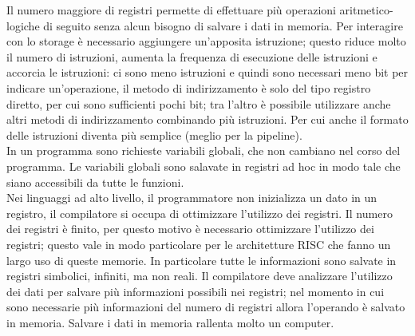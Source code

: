 \documentclass{article}
\begin{document}


Il numero maggiore di registri permette di effettuare più operazioni aritmetico-logiche di seguito senza alcun bisogno di salvare i dati in memoria. Per interagire con lo storage è necessario aggiungere un'apposita istruzione; questo riduce molto il numero di istruzioni, aumenta la frequenza di esecuzione delle istruzioni e accorcia le istruzioni: ci sono meno istruzioni e quindi sono necessari meno bit per indicare un'operazione, il metodo di indirizzamento è solo del tipo registro diretto, per cui sono sufficienti pochi bit; tra l'altro è possibile utilizzare anche altri metodi di indirizzamento combinando più istruzioni. Per cui anche il formato delle istruzioni diventa più semplice (meglio per la pipeline).\\
In un programma sono richieste variabili globali, che non cambiano nel corso del programma.
Le variabili globali sono salavate in registri ad hoc in modo tale che siano accessibili da tutte le funzioni. \\
Nei linguaggi ad alto livello, il programmatore non inizializza un dato in un registro, il compilatore si occupa di ottimizzare l'utilizzo dei registri. Il numero dei registri è finito, per questo motivo è necessario ottimizzare l'utilizzo dei registri; questo vale in modo particolare per le architetture RISC che fanno un largo uso di queste memorie.
In particolare tutte le informazioni sono salvate in registri simbolici, infiniti, ma non reali. Il compilatore deve analizzare l'utilizzo dei dati per salvare più informazioni possibili nei registri; nel momento in cui sono necessarie più informazioni del numero di registri allora l'operando è salvato in memoria. Salvare i dati in memoria rallenta molto un computer.
\end{document}
